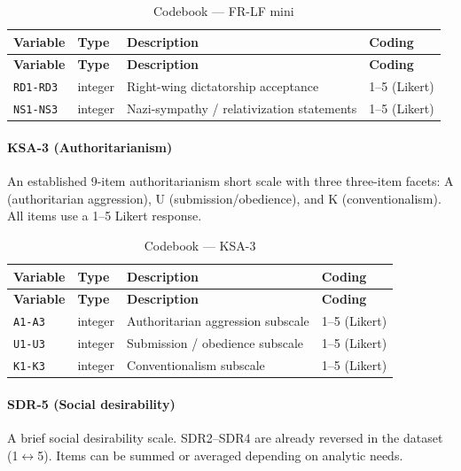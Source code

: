 \documentclass[11pt,a4paper]{article}
\begin{document}
{\small
\begin{longtable}{p{3cm} p{1.5cm} p{5.5cm} p{4cm}}
\caption{Codebook --- FR-LF mini}\\
\toprule
\textbf{Variable} & \textbf{Type} & \textbf{Description} & \textbf{Coding}\\
\midrule
\endfirsthead
\toprule
\textbf{Variable} & \textbf{Type} & \textbf{Description} & \textbf{Coding}\\
\midrule
\endhead
\bottomrule
\endfoot

\texttt{RD1-RD3} & integer & Right-wing dictatorship acceptance & 1--5 (Likert) \\
\texttt{NS1-NS3} & integer & Nazi-sympathy / relativization statements & 1--5 (Likert) \\
\end{longtable}
}

\paragraph{KSA-3 (Authoritarianism)}
An established 9-item authoritarianism short scale with three three-item facets: A (authoritarian aggression), U (submission/obedience), and K (conventionalism). All items use a 1--5 Likert response.

{\small
\begin{longtable}{p{3cm} p{1.5cm} p{5.5cm} p{4cm}}
\caption{Codebook --- KSA-3}\\
\toprule
\textbf{Variable} & \textbf{Type} & \textbf{Description} & \textbf{Coding}\\
\midrule
\endfirsthead
\toprule
\textbf{Variable} & \textbf{Type} & \textbf{Description} & \textbf{Coding}\\
\midrule
\endhead
\bottomrule
\endfoot

\texttt{A1-A3} & integer & Authoritarian aggression subscale & 1--5 (Likert) \\
\texttt{U1-U3} & integer & Submission / obedience subscale & 1--5 (Likert) \\
\texttt{K1-K3} & integer & Conventionalism subscale & 1--5 (Likert) \\
\end{longtable}
}

\paragraph{SDR-5 (Social desirability)}
A brief social desirability scale. SDR2--SDR4 are already reversed in the dataset (1$\leftrightarrow$5). Items can be summed or averaged depending on analytic needs.
\end{document}
